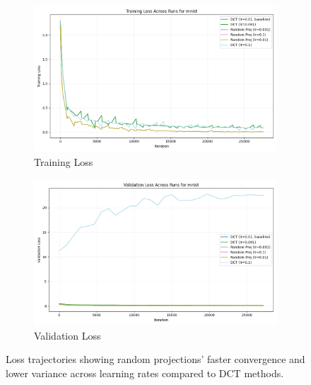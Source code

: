 \documentclass{article} %
\begin{document}
\begin{figure}[h]
    \centering
    \begin{subfigure}{0.49\textwidth}
        \includegraphics[width=\textwidth]{train_loss_mnist_across_runs.png}
        \caption{Training Loss}
        \label{fig:loss_train}
    \end{subfigure}
    \hfill
    \begin{subfigure}{0.49\textwidth}
        \includegraphics[width=\textwidth]{val_loss_mnist_across_runs.png}
        \caption{Validation Loss}
        \label{fig:loss_val}
    \end{subfigure}
    \caption{Loss trajectories showing random projections' faster convergence and lower variance across learning rates compared to DCT methods.}
    \label{fig:training_curves}
\end{figure}
\end{document}

